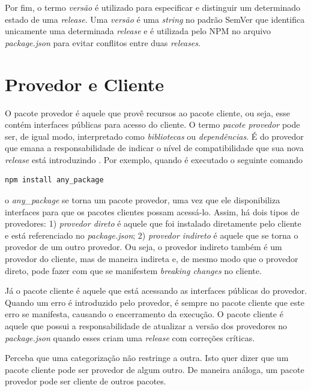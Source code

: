 Por fim, o termo \textit{versão} é utilizado para especificar e distinguir um determinado estado de uma \textit{release}. Uma \textit{versão} é uma \textit{string} no padrão \gls{SemVer} que identifica unicamente uma determinada \textit{release} e é utilizada pelo \gls{NPM} no arquivo \textit{package.json} para evitar conflitos entre duas \textit{releases}.

\section{Provedor e Cliente}
\label{ref-teo:prov_clie}
O pacote provedor é aquele que provê recursos ao pacote cliente, ou seja, esse contém interfaces públicas para acesso do cliente. O termo \textit{pacote provedor} pode ser, de igual modo, interpretado como \textit{bibliotecas} ou \textit{dependências}. É do provedor que emana a responsabilidade de indicar o nível de compatibilidade que sua nova \textit{release} está introduzindo \cite{teorical_reference:semver}. Por exemplo, quando é executado o seguinte comando

\begin{lstlisting}[style=bash, label=cod:install:provider]
npm install any_package
\end{lstlisting}

o \textit{any\_package} se torna um pacote provedor, uma vez que ele disponibiliza interfaces para que os pacotes clientes possam acessá-lo. Assim, há dois tipos de provedores: 1) \textit{provedor direto} é aquele que foi instalado diretamente pelo cliente e está referenciado no \textit{package.json}; 2) \textit{provedor indireto} é aquele que se torna o provedor de um outro provedor. Ou seja, o provedor indireto também é um provedor do cliente, mas de maneira indireta e, de mesmo modo que o provedor direto, pode fazer com que se manifestem \textit{breaking changes} no cliente.

Já o pacote cliente é aquele que está acessando as interfaces públicas do provedor. Quando um erro é introduzido pelo provedor, é sempre no pacote cliente que este erro se manifesta, causando o encerramento da execução. O pacote cliente é aquele que possui a responsabilidade de atualizar a versão dos provedores no \textit{package.json} quando esses criam uma \textit{release} com correções críticas.

Perceba que uma categorização não restringe a outra. Isto quer dizer que um pacote cliente pode ser provedor de algum outro. De maneira análoga, um pacote provedor pode ser cliente de outros pacotes.